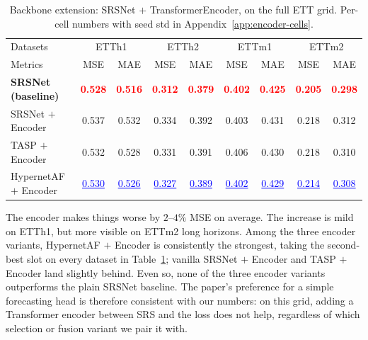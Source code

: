 \documentclass[10pt]{article}
\begin{document}
\begin{table}[t]
  \caption{Backbone extension: SRSNet $+$ TransformerEncoder, on
    the full ETT grid. Per-cell numbers with seed std in
    Appendix~\ref{app:encoder-cells}.}
  \label{tab:encoder-ext}
  \begin{center}
  \footnotesize
  \setlength{\tabcolsep}{4pt}
  \begin{tabular}{l|cc|cc|cc|cc}
    \toprule
    Datasets & \multicolumn{2}{c|}{ETTh1} & \multicolumn{2}{c|}{ETTh2}
             & \multicolumn{2}{c|}{ETTm1} & \multicolumn{2}{c}{ETTm2} \\
    Metrics  & MSE & MAE & MSE & MAE & MSE & MAE & MSE & MAE \\
    \midrule
    \textbf{SRSNet (baseline)} & \textcolor{red}{\textbf{0.528}} & \textcolor{red}{\textbf{0.516}} & \textcolor{red}{\textbf{0.312}} & \textcolor{red}{\textbf{0.379}} & \textcolor{red}{\textbf{0.402}} & \textcolor{red}{\textbf{0.425}} & \textcolor{red}{\textbf{0.205}} & \textcolor{red}{\textbf{0.298}} \\
    \midrule
    SRSNet $+$ Encoder     & 0.537 & 0.532 & 0.334 & 0.392 & 0.403 & 0.431 & 0.218 & 0.312 \\
    TASP $+$ Encoder       & 0.532 & 0.528 & 0.331 & 0.391 & 0.406 & 0.430 & 0.218 & 0.310 \\
    HypernetAF $+$ Encoder & \textcolor{blue}{\underline{0.530}} & \textcolor{blue}{\underline{0.526}} & \textcolor{blue}{\underline{0.327}} & \textcolor{blue}{\underline{0.389}} & \textcolor{blue}{\underline{0.402}} & \textcolor{blue}{\underline{0.429}} & \textcolor{blue}{\underline{0.214}} & \textcolor{blue}{\underline{0.308}} \\
    \bottomrule
  \end{tabular}
  \end{center}
\end{table}

The encoder makes things worse by $2$--$4\%$ MSE on average. The
increase is mild on ETTh1, but more visible on ETTm2 long horizons.
Among the three encoder variants, HypernetAF $+$ Encoder is consistently
the strongest, taking the second-best slot on every dataset in
Table~\ref{tab:encoder-ext}; vanilla SRSNet $+$ Encoder and TASP $+$ Encoder
land slightly behind. Even so, none of the three encoder variants outperforms
the plain SRSNet baseline. The paper's preference for a simple forecasting head
is therefore consistent with our numbers: on this grid, adding a Transformer
encoder between SRS and the loss does not help, regardless of which selection
or fusion variant we pair it with.
\end{document}
